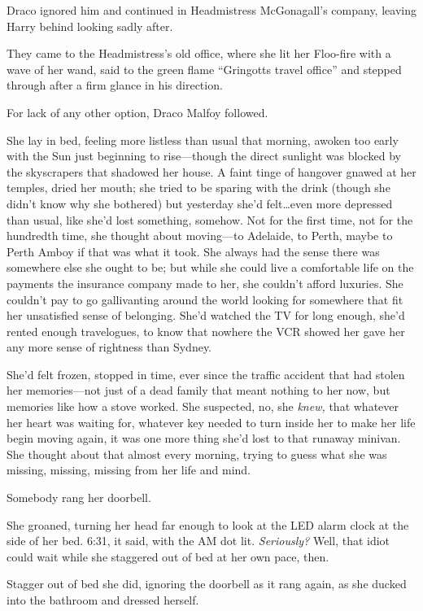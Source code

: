 Draco ignored him and continued in Headmistress McGonagall’s company, leaving Harry behind looking sadly after.

They came to the Headmistress’s old office, where she lit her Floo-fire with a wave of her wand, said to the green flame “Gringotts travel office” and stepped through after a firm glance in his direction.

For lack of any other option, Draco Malfoy followed.

\later

She lay in bed, feeling more listless than usual that morning, awoken too early with the Sun just beginning to rise—though the direct sunlight was blocked by the skyscrapers that shadowed her house. A faint tinge of hangover gnawed at her temples, dried her mouth; she tried to be sparing with the drink (though she didn’t know why she bothered) but yesterday she’d felt…even more depressed than usual, like she’d lost something, somehow. Not for the first time, not for the hundredth time, she thought about moving—to Adelaide, to Perth, maybe to Perth Amboy if that was what it took. She always had the sense there was somewhere else she ought to be; but while she could live a comfortable life on the payments the insurance company made to her, she couldn’t afford luxuries. She couldn’t pay to go gallivanting around the world looking for somewhere that fit her unsatisfied sense of belonging. She’d watched the TV for long enough, she’d rented enough travelogues, to know that nowhere the VCR showed her gave her any more sense of rightness than Sydney.

She’d felt frozen, stopped in time, ever since the traffic accident that had stolen her memories—not just of a dead family that meant nothing to her now, but memories like how a stove worked. She suspected, no, she \emph{knew,} that whatever her heart was waiting for, whatever key needed to turn inside her to make her life begin moving again, it was one more thing she’d lost to that runaway minivan. She thought about that almost every morning, trying to guess what she was missing, missing, missing from her life and mind.

Somebody rang her doorbell.

She groaned, turning her head far enough to look at the LED alarm clock at the side of her bed. 6:31, it said, with the AM dot lit. \emph{Seriously?} Well, that idiot could wait while she staggered out of bed at her own pace, then.

Stagger out of bed she did, ignoring the doorbell as it rang again, as she ducked into the bathroom and dressed herself.

